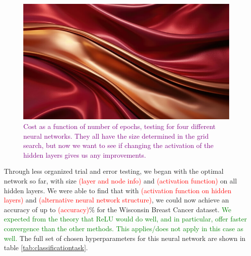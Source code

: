 \begin{figure}
    \centering
    \includegraphics[width=\linewidth]{figures/placeholders/activationfunctions_cost.png}
    \caption{\textcolor{purple}{Cost as a function of number of epochs, testing for four different neural networks. They all have the size determined in the grid search, but now we want to see if changing the activation of the hidden layers gives us any improvements.}}
    \label{fig:activationfunctions_cost}
\end{figure}

Through less organized trial and error testing, we began with the optimal network so far, with size \textcolor{red}{(layer and node info)} and \textcolor{red}{(activation function)} on all hidden layers. We were able to find that with \textcolor{red}{(activation function on hidden layers)} and \textcolor{red}{(alternative neural network structure)}, we could now achieve an accuracy of up to \textcolor{red}{(accuracy)}\% for the Wisconsin Breast Cancer dataset. \textcolor{green}{We expected from the theory that ReLU would do well, and in particular, offer faster convergence than the other methods. This applies/does not apply in this case as well.} The full set of chosen hyperparameters for this neural network are shown in table \ref{tab:classificationtask}.

